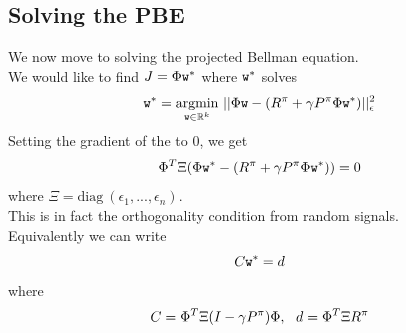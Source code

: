\subsection{Solving the PBE}
We now move to solving the projected Bellman equation.\\
We would like to find $J = \Phi \texttt{w}^*$ where $\texttt{w}^*$ solves
$$\texttt{w}^* = \underset{{\texttt{w} \in \mathbb{R}^k}}{\operatorname{argmin}} \ ||\Phi \texttt{w} - (R^\pi+\gamma P^\pi\Phi \texttt{w}^*)||_\epsilon^2$$
Setting the gradient of the to $0$, we get
$$\Phi^T \Xi (\Phi \texttt{w}^* - (R^\pi+\gamma P^\pi \Phi \texttt{w}^*)) = 0$$
where $\Xi = \textrm{diag} \ (\epsilon_1,...,\epsilon_n)$.\\
This is in fact the orthogonality condition from random signals.\\
Equivalently we can write
$$C \texttt{w}^* = d$$
where
$$C = \Phi^T \Xi(I-\gamma P^\pi) \Phi, \ \ d = \Phi^T\Xi R^\pi$$

